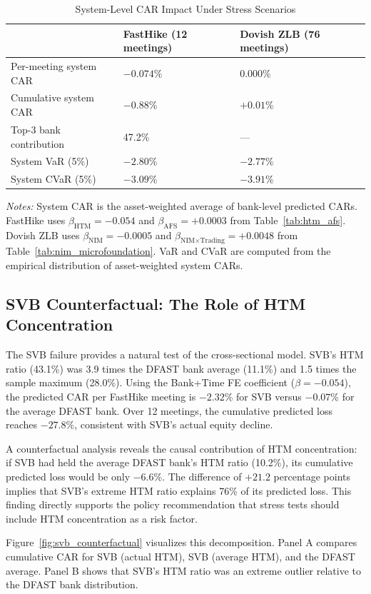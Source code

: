 \documentclass[12pt,a4paper]{article}
\begin{document}
\begin{table}[H]
\centering
\caption{System-Level CAR Impact Under Stress Scenarios}
\label{tab:aggregate}
\small
\begin{tabular}{lll}
\toprule
 & FastHike (12 meetings) & Dovish ZLB (76 meetings) \\
\midrule
Per-meeting system CAR & $-0.074$\% & $0.000$\% \\
Cumulative system CAR & $-0.88$\% & $+0.01$\% \\
Top-3 bank contribution & 47.2\% & --- \\
System VaR (5\%) & $-2.80$\% & $-2.77$\% \\
System CVaR (5\%) & $-3.09$\% & $-3.91$\% \\
\bottomrule
\end{tabular}
\end{table}
\noindent\textit{Notes:} System CAR is the asset-weighted average of bank-level predicted CARs. FastHike uses $\beta_{\text{HTM}} = -0.054$ and $\beta_{\text{AFS}} = +0.0003$ from Table~\ref{tab:htm_afs}. Dovish ZLB uses $\beta_{\text{NIM}} = -0.0005$ and $\beta_{\text{NIM}\times\text{Trading}} = +0.0048$ from Table~\ref{tab:nim_microfoundation}. VaR and CVaR are computed from the empirical distribution of asset-weighted system CARs.

\subsection{SVB Counterfactual: The Role of HTM Concentration}

The SVB failure provides a natural test of the cross-sectional model. SVB's HTM ratio (43.1\%) was 3.9 times the DFAST bank average (11.1\%) and 1.5 times the sample maximum (28.0\%). Using the Bank+Time FE coefficient ($\beta = -0.054$), the predicted CAR per FastHike meeting is $-2.32$\% for SVB versus $-0.07$\% for the average DFAST bank. Over 12 meetings, the cumulative predicted loss reaches $-27.8$\%, consistent with SVB's actual equity decline.

A counterfactual analysis reveals the causal contribution of HTM concentration: if SVB had held the average DFAST bank's HTM ratio (10.2\%), its cumulative predicted loss would be only $-6.6$\%. The difference of $+21.2$ percentage points implies that SVB's extreme HTM ratio explains 76\% of its predicted loss. This finding directly supports the policy recommendation that stress tests should include HTM concentration as a risk factor.

Figure~\ref{fig:svb_counterfactual} visualizes this decomposition. Panel A compares cumulative CAR for SVB (actual HTM), SVB (average HTM), and the DFAST average. Panel B shows that SVB's HTM ratio was an extreme outlier relative to the DFAST bank distribution.
\end{document}
